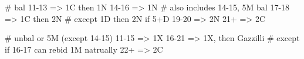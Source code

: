 # bal
11-13 => 1C then 1N
14-16 => 1N          # also includes 14-15, 5M bal
17-18 => 1C then 2N  # except 1D then 2N if 5+D
19-20 => 2N
21+   => 2C

# unbal or 5M (except 14-15)
11-15 => 1X
16-21 => 1X, then Gazzilli  # except if 16-17 can rebid 1M natrually
22+   => 2C